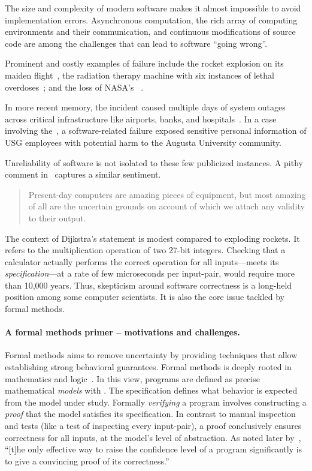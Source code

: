 The size and complexity of modern software makes it almost impossible to avoid
implementation errors. Asynchronous computation, the rich array of computing
environments and their communication, and continuous modifications of source
code are among the challenges that can lead to software \enquote{going wrong}.

Prominent and costly examples of failure include the  rocket
explosion on its maiden flight~\cite{ariane5}, the  radiation
therapy machine with six instances of lethal overdoses~\cite{leveson1993}; and
the loss of NASA's ~\cite{mars1999}.

In more recent memory, the  incident caused multiple days of
system outages across critical infrastructure like airports, banks, and
hospitals~\cite{crowdstrike}. In a case involving the~\textcite{usg2024}, a
software-related failure exposed sensitive personal information of USG employees
with potential harm to the Augusta University community.

Unreliability of software is not isolated to these few publicized instances.
A pithy comment in~\textcite[p. 3]{dijkstra1970} captures a similar sentiment.

\begin{quotation}
\noindent{}Present-day computers are amazing pieces of equipment, but most
amazing of all are the uncertain grounds on account of which we attach any
validity to their output.
\end{quotation}

The context of Dijkstra's statement is modest compared to exploding rockets. It
refers to the multiplication operation of two 27-bit integers. Checking that a
calculator actually performs the correct operation for all inputs---\ie meets
its \emph{specification}---at a rate of few microseconds
per input-pair, would require more than 10,000 years. Thus, skepticism around
software correctness is a long-held position among some computer scientists. It
is also the core issue tackled by formal methods.

\paragraph*{A formal methods primer -- motivations and challenges.}
Formal methods aims to remove uncertainty by providing techniques that allow
establishing strong behavioral guarantees. Formal methods is deeply rooted in
mathematics and logic~\cite{shankar2023}. In this view, programs are defined as
precise mathematical \emph{models} with . The specification
defines what behavior is expected from the model under study. Formally
\emph{verifying} a program involves constructing a
\emph{proof} that the model satisfies its specification. In contrast to manual
inspection and tests (like a test of inspecting every input-pair), a proof
conclusively ensures correctness for all inputs, at the model's level of
abstraction. As noted later by~\textcite{dijkstra1972}, \enquote{{[t]he only
effective way to raise the confidence level of a program significantly is to
give a convincing proof of its correctness.}}

